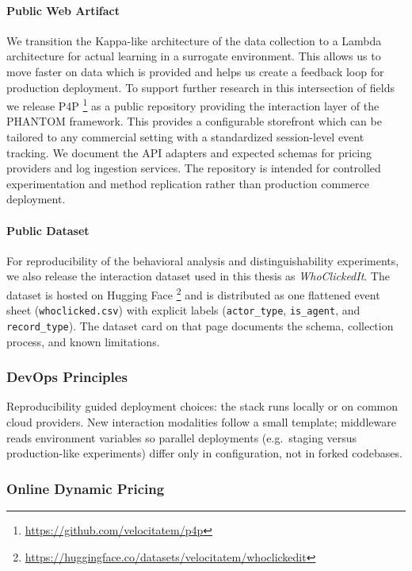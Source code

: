\paragraph{Public Web Artifact} We transition the Kappa-like architecture of the data collection to a Lambda architecture for actual learning in a surrogate environment. This allows us to move faster on data which is provided and helps us create a feedback loop for production deployment. To support further research in this intersection of fields we release P4P \footnote{\url{https://github.com/velocitatem/p4p}} as a public repository providing the interaction layer of the PHANTOM framework. This provides a configurable storefront which can be tailored to any commercial setting with a standardized session-level event tracking. We document the API adapters and expected schemas for pricing providers and log ingestion services. The repository is intended for controlled experimentation and method replication rather than production commerce deployment.

\paragraph{Public Dataset} For reproducibility of the behavioral analysis and distinguishability experiments, we also release the interaction dataset used in this thesis as \textit{WhoClickedIt}. The dataset is hosted on Hugging Face \footnote{\url{https://huggingface.co/datasets/velocitatem/whoclickedit}} and is distributed as one flattened event sheet (\texttt{whoclicked.csv}) with explicit labels (\texttt{actor\_type}, \texttt{is\_agent}, and \texttt{record\_type}). The dataset card on that page documents the schema, collection process, and known limitations.


\subsubsection{DevOps Principles}

Reproducibility guided deployment choices: the stack runs locally or on common cloud providers. New interaction modalities follow a small template; middleware reads environment variables so parallel deployments (e.g.\ staging versus production-like experiments) differ only in configuration, not in forked codebases.

\subsubsection{Online Dynamic Pricing}

